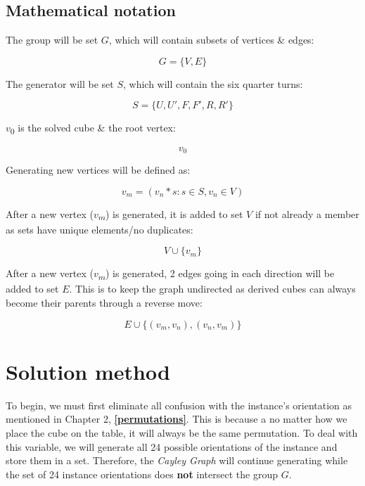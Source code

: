 \documentclass[a4paper]{article}
\begin{document}
\subsection{Mathematical notation}

\par The group will be set $G$, which will contain subsets of vertices \& edges:

\[G=\{V,E\}\]

\par The generator will be set $S$, which will contain the six quarter turns:

\[S=\{U,U',F,F',R,R'\}\]

\newpage

\par $v$\textsubscript{0} is the solved cube \& the root vertex:

\[v_0\]

\par Generating new vertices will be defined as:

\[v_m = (v_n * s : s\in S, v_n\in V)\]

\par After a new vertex ($v$\textsubscript{$m$}) is generated, it is added to set $V$ if not already a member as sets have unique elements/no duplicates:

\[V\cup \{v_m\}\]

\par After a new vertex ($v$\textsubscript{$m$}) is generated, 2 edges going in each direction will be added to set $E$. This is to keep the graph undirected as derived cubes can always become their parents through a reverse move:

\[E\cup \{(v_m,v_n),(v_n,v_m)\}\]

\section{Solution method}
\par To begin, we must first eliminate all confusion with the instance's orientation as mentioned in Chapter 2, \textbf{\autoref{permutations}}. This is because a no matter how we place the cube on the table, it will always be the same permutation. To deal with this variable, we will generate all 24 possible orientations of the instance and store them in a set. Therefore, the \emph{Cayley Graph} will continue generating while the set of 24 instance orientations does \textbf{not} intersect the group $G$. 
\end{document}
